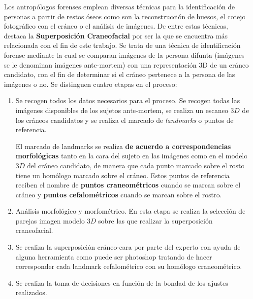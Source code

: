 \noindent Los antropólogos forenses emplean diversas técnicas para la identificación de personas a partir de restos óseos como son la reconstrucción de huesos, el cotejo fotográfico con el cráneo o el análisis de imágenes. De entre estas técnicas, destaca la \textbf{Superposición Craneofacial} por ser la que se encuentra más relacionada con el fin de este trabajo. Se trata de una técnica de identificación forense mediante la cual se comparan imágenes de la persona difunta (imágenes se le denominan imágenes ante-mortem) con una representación 3D de un cráneo candidato, con el fin de determinar si el cráneo pertenece a la persona de las imágenes o no. Se distinguen cuatro etapas en el proceso: 

\begin{enumerate}
    \item Se recogen todos los datos necesarios para el proceso. Se recogen todas las imágenes disponibles de los sujetos ante-mortem, se realiza un escaneo $3D$ de los cráneos candidatos y se realiza el marcado de \textit{landmarks} o puntos de referencia. 
    
    \medskip
    
    \noindent El marcado de landmarks se realiza \textbf{de acuerdo a correspondencias morfológicas} tanto en la cara del sujeto en las imágenes como en el modelo $3D$ del cráneo candidato, de manera que cada punto marcado sobre el rosto tiene un homólogo marcado sobre el cráneo. Estos puntos de referencia reciben el nombre de \textbf{puntos craneométricos} cuando se marcan sobre el cráneo y \textbf{puntos cefalométricos} cuando se marcan sobre el rostro.
    \item Análisis morfológico y morfométrico. En esta etapa se realiza la selección de parejas imagen modelo $3D$ sobre las que realizar la superposición craneofacial.
    \item Se realiza la superposición cráneo-cara por parte del experto con ayuda de alguna herramienta como puede ser photoshop tratando de hacer corresponder cada landmark cefalométrico con su homólogo craneométrico.
    \item Se realiza la toma de decisiones en función de la bondad de los ajustes realizados.
\end{enumerate}

